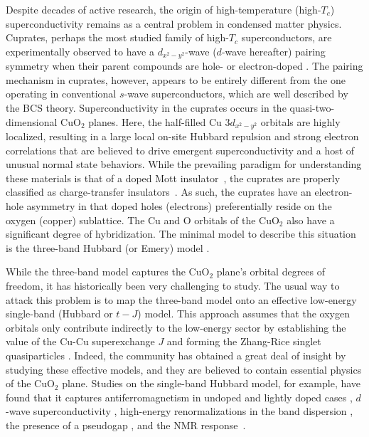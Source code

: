 \documentclass[reprint,nofootinbib,nobibnotes,amsmath,amssymb,aps,prb,floatfix]{revtex4-1}
\begin{document}
Despite decades of active research, the origin of high-temperature (high-$T_c$) superconductivity remains as a central problem in condensed matter physics. Cuprates, perhaps the most studied family of high-$T_c$ superconductors, are experimentally observed to have a $d_{x^2-y^2}$-wave ($d$-wave hereafter) pairing symmetry when their parent compounds are hole- or electron-doped \cite{Kirtley}. The pairing mechanism in cuprates, however, appears to be entirely different \cite{LeeRMP2006, ScalapinoRMP2012} from the one operating in conventional $s$-wave superconductors, which are well described by the BCS theory. Superconductivity in the cuprates occurs in the quasi-two-dimensional CuO$_2$ planes. Here, the half-filled Cu $3d_{x^2-y^2}$ orbitals are highly localized, resulting in a large local on-site Hubbard repulsion and strong electron correlations that are believed to drive emergent superconductivity and a host of unusual normal state behaviors. 
While the prevailing paradigm for understanding these materials is that of a doped Mott insulator~\cite{LeeRMP2006}, the cuprates are properly classified as charge-transfer insulators~\cite{ZSA}. As such, the cuprates have an electron-hole asymmetry in that doped holes (electrons) preferentially reside on the oxygen (copper) sublattice. The Cu and O orbitals of the CuO$_2$ also have a significant degree of hybridization. The minimal model to describe this situation is the three-band Hubbard (or Emery) model \cite{Emery}. 

While the three-band model captures the CuO$_2$ plane's orbital degrees of freedom, it has historically been very challenging to study. The usual way to attack this problem is to map the three-band model onto an effective low-energy single-band (Hubbard or $t-J$) model. This approach assumes that the oxygen orbitals only contribute indirectly to the low-energy sector by establishing the value of the Cu-Cu superexchange $J$ and forming the Zhang-Rice singlet quasiparticles \cite{ZR}. Indeed, the community has obtained a great deal of insight by studying these effective models, and they are believed to contain essential physics of the CuO$_2$ plane. Studies on the single-band Hubbard model, for example, have found that it captures antiferromagnetism in undoped \cite{WhitePRB1989} and lightly doped cases \cite{Dagotto}, $d$-wave superconductivity \cite{Maier2}, high-energy renormalizations in the band dispersion \cite{Macridin2007, Moritz2009}, the presence of a pseudogap \cite{Gull2009}, and the NMR response~\cite{Chen2017}. 
\end{document}
